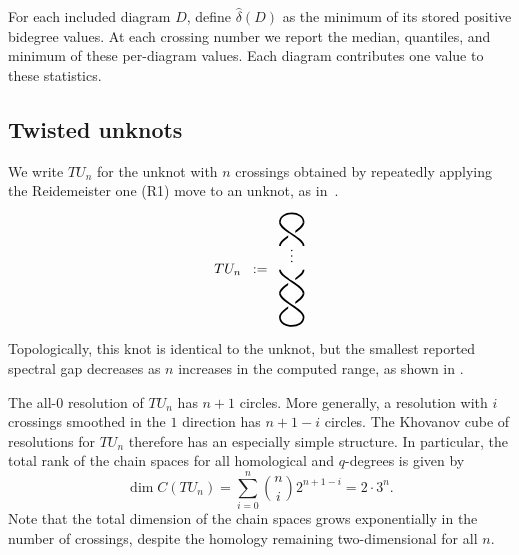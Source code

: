 \documentclass[a4paper,onecolumn,unpublished]{quantumarticle}
\theoremstyle{plain}
\theoremstyle{definition}
\theoremstyle{definition}
\numberwithin{equation}{section}
\newcommand{\hackcenter}[1]{
 \xy (0,0)*{#1}; \endxy}
\begin{document}
For each included diagram $D$, define $\widehat\delta(D)$ as the minimum of its stored
positive bidegree values.  At each crossing number we report the median,
quantiles, and minimum of these per-diagram values. Each diagram contributes
one value to these statistics.

\subsection{Twisted unknots}\label{subsec:twisted}
We write $TU_n$ for the unknot with $n$ crossings obtained by repeatedly applying
the Reidemeister one (R1) move to an unknot, as
in~\cite[Section~4.5]{GrljLaudaSpectralGeometry}.
\begin{equation}\label{eq:twists}
TU_n \;\; := \;\;
\hackcenter{\begin{tikzpicture}[scale=.6]
  \draw [very thick] (1,1) .. controls +(0,.35) and +(0,-.35) .. (2,2);
  \draw [very thick] (1,2) .. controls +(0,.35) and +(0,-.35) .. (2,3);
  \draw [very thick] (1,4) .. controls +(0,.35) and +(0,-.35) .. (2,5);
  \path [fill=white] (1.35,1) rectangle (1.65,5);
  \draw [very thick] (2,1) .. controls +(0,.35) and +(0,-.35) .. (1,2);
  \draw [very thick] (2,2) .. controls +(0,.35) and +(0,-.35) .. (1,3);
  \draw [very thick] (2,4) .. controls +(0,.35) and +(0,-.35) .. (1,5);
  \draw [very thick] (2,5) .. controls +(0,.5) and +(0,.5) .. (1,5);
  \draw [very thick] (2,1) .. controls +(0,-.5) and +(0,-.5) .. (1,1);
  \node at (1.5,3.75) {$\vdots$};
\end{tikzpicture}}
\end{equation}
Topologically, this knot is identical to the unknot, but the smallest reported
spectral gap decreases as $n$ increases in the computed range, as shown in
.

The all-$0$ resolution of $TU_n$ has $n+1$ circles. More generally, a resolution
with $i$ crossings smoothed in the $1$ direction has $n+1-i$ circles. The
Khovanov cube of resolutions for $TU_n$ therefore has an especially simple
structure. In particular, the total rank of the chain spaces for all
homological and $q$-degrees is given by
\begin{equation}
\dim C(TU_n)=\sum_{i=0}^{n}\binom ni2^{n+1-i}=2\cdot3^n.
\label{eq:twisted_chain_dimension}
\end{equation}
Note that the total dimension of the chain spaces grows exponentially in the
number of crossings, despite the homology remaining two-dimensional for all $n$.
\end{document}
